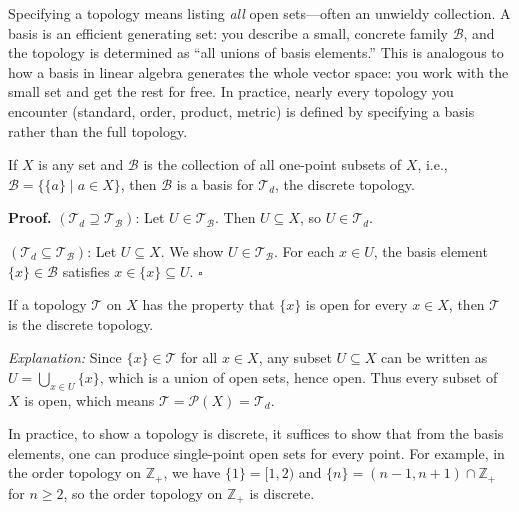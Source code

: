 \documentclass[11pt]{report}
\renewenvironment{proof}[1][Proof]{\noindent\textbf{#1.} }{\hfill$\square$\par\vspace{5pt}}
\begin{document}
\begin{rembox}
Specifying a topology means listing \emph{all} open sets---often an unwieldy collection. A basis is an efficient generating set: you describe a small, concrete family $\mathcal{B}$, and the topology is determined as ``all unions of basis elements.'' This is analogous to how a basis in linear algebra generates the whole vector space: you work with the small set and get the rest for free. In practice, nearly every topology you encounter (standard, order, product, metric) is defined by specifying a basis rather than the full topology.
\end{rembox}

\begin{exbox}
If $X$ is any set and $\mathcal{B}$ is the collection of all one-point subsets of $X$, i.e., $\mathcal{B} = \{\{a\} \mid a \in X\}$, then $\mathcal{B}$ is a basis for $\mathcal{T}_d$, the discrete topology.

\begin{proof}
$(\mathcal{T}_d \supseteq \mathcal{T}_{\mathcal{B}})$: Let $U \in \mathcal{T}_{\mathcal{B}}$. Then $U \subseteq X$, so $U \in \mathcal{T}_d$. \checkmark

$(\mathcal{T}_d \subseteq \mathcal{T}_{\mathcal{B}})$: Let $U \subseteq X$. We show $U \in \mathcal{T}_{\mathcal{B}}$. For each $x \in U$, the basis element $\{x\} \in \mathcal{B}$ satisfies $x \in \{x\} \subseteq U$. \checkmark
\end{proof}
\end{exbox}

\begin{rembox}
If a topology $\mathcal{T}$ on $X$ has the property that $\{x\}$ is open for every $x \in X$, then $\mathcal{T}$ is the discrete topology.

\textit{Explanation:} Since $\{x\} \in \mathcal{T}$ for all $x \in X$, any subset $U \subseteq X$ can be written as $U = \bigcup_{x \in U} \{x\}$, which is a union of open sets, hence open. Thus every subset of $X$ is open, which means $\mathcal{T} = \mathcal{P}(X) = \mathcal{T}_d$.

In practice, to show a topology is discrete, it suffices to show that from the basis elements, one can produce single-point open sets for every point. For example, in the order topology on $\mathbb{Z}_+$, we have $\{1\} = [1, 2)$ and $\{n\} = (n-1, n+1) \cap \mathbb{Z}_+$ for $n \geq 2$, so the order topology on $\mathbb{Z}_+$ is discrete.
\end{rembox}
\end{document}
